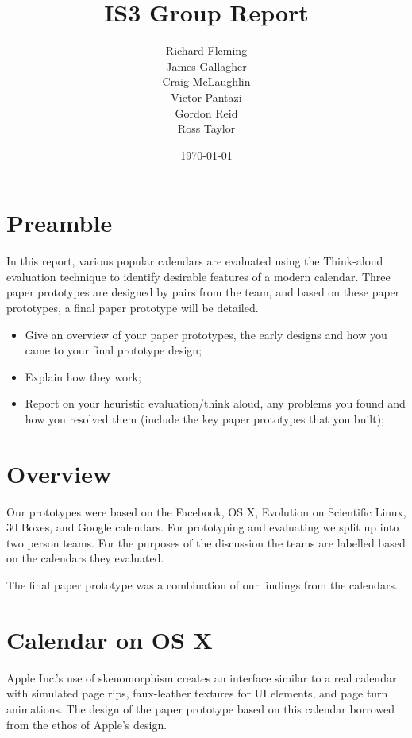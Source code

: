 \documentclass{article}
\title{IS3 Group Report}
\author{
  Richard Fleming \\
  James Gallagher \\
  Craig McLaughlin \\
  Victor Pantazi \\
  Gordon Reid \\
  Ross Taylor}
\date{\today}
\begin{document}

\maketitle


\section{Preamble}

In this report, various popular calendars are evaluated using the
Think-aloud evaluation technique to identify desirable features of a
modern calendar. Three paper prototypes are designed by pairs from the
team, and based on these paper prototypes, a final paper prototype will
be detailed.


\begin{itemize}
\item Give an overview of your paper prototypes, the early designs and
how you came to your final prototype design;

\item Explain how they work;

\item Report on your heuristic evaluation/think aloud, any problems you
found and how you resolved them (include the key paper prototypes that
you built);
\end{itemize}

\section{Overview}

Our prototypes were based on the Facebook, OS X, Evolution on Scientific
Linux, 30 Boxes, and Google calendars. For prototyping and evaluating
we split up into two person teams. For the purposes of the discussion
the teams are labelled based on the calendars they evaluated.

The final paper prototype was a combination of our findings from the
calendars.

\section{Calendar on OS X}

Apple Inc.'s use of skeuomorphism creates an interface similar to a real 
calendar with simulated page rips, faux-leather textures for UI
elements, and page turn animations. The design of the paper prototype
based on this calendar borrowed from the ethos of Apple's design.
\end{document}
